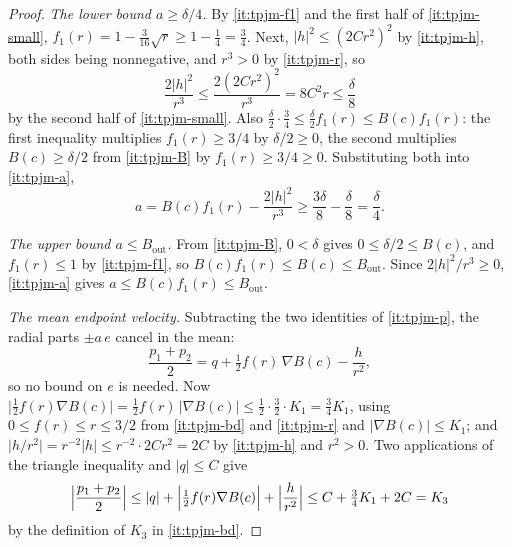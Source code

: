 \begin{proof}
\emph{The lower bound $a\ge\delta/4$.} By \ref{it:tpjm-f1} and the first half of
\ref{it:tpjm-small}, $f_1(r)=1-\tfrac3{16}\sqrt r\ge1-\tfrac14=\tfrac34$. Next,
$|h|^2\le(2Cr^2)^2$ by \ref{it:tpjm-h}, both sides being nonnegative, and
$r^3>0$ by \ref{it:tpjm-r}, so
\[
  \frac{2|h|^2}{r^3}\le\frac{2(2Cr^2)^2}{r^3}=8C^2r\le\frac\delta8
\]
by the second half of \ref{it:tpjm-small}. Also
$\tfrac\delta2\cdot\tfrac34\le\tfrac\delta2f_1(r)\le B(c)f_1(r)$: the first
inequality multiplies $f_1(r)\ge3/4$ by $\delta/2\ge0$, the second multiplies
$B(c)\ge\delta/2$ from \ref{it:tpjm-B} by $f_1(r)\ge3/4\ge0$. Substituting both
into \ref{it:tpjm-a},
\[
  a=B(c)f_1(r)-\frac{2|h|^2}{r^3}
   \ge\frac{3\delta}{8}-\frac\delta8=\frac\delta4 .
\]

\emph{The upper bound $a\le B_{\mathrm{out}}$.} From \ref{it:tpjm-B},
$0<\delta$ gives $0\le\delta/2\le B(c)$, and $f_1(r)\le1$ by \ref{it:tpjm-f1},
so $B(c)f_1(r)\le B(c)\le B_{\mathrm{out}}$. Since
$2|h|^2/r^3\ge0$, \ref{it:tpjm-a} gives
$a\le B(c)f_1(r)\le B_{\mathrm{out}}$.

\emph{The mean endpoint velocity.} Subtracting the two identities of
\ref{it:tpjm-p}, the radial parts $\pm a\,e$ cancel in the mean:
\[
  \frac{p_1+p_2}{2}=q+\tfrac12f(r)\,\nabla B(c)-\frac{h}{r^2},
\]
so no bound on $e$ is needed. Now
$\bigl|\tfrac12f(r)\nabla B(c)\bigr|=\tfrac12f(r)\,|\nabla B(c)|
\le\tfrac12\cdot\tfrac32\cdot K_1=\tfrac34K_1$, using $0\le f(r)\le r\le3/2$
from \ref{it:tpjm-bd} and \ref{it:tpjm-r} and $|\nabla B(c)|\le K_1$; and
$\bigl|h/r^2\bigr|=r^{-2}|h|\le r^{-2}\cdot2Cr^2=2C$ by \ref{it:tpjm-h} and
$r^2>0$. Two applications of the triangle inequality and $|q|\le C$ give
\[
  \Bigl|\frac{p_1+p_2}{2}\Bigr|
   \le|q|+\Bigl|\tfrac12f(r)\nabla B(c)\Bigr|+\Bigl|\frac{h}{r^2}\Bigr|
   \le C+\tfrac34K_1+2C=K_3
\]
by the definition of $K_3$ in \ref{it:tpjm-bd}.


\end{proof}
